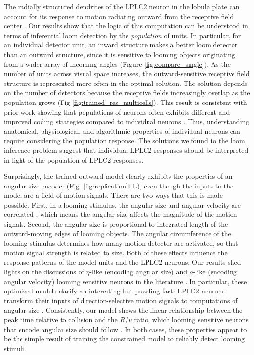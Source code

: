 \documentclass[pdftex,9pt,lineno]{elife}
\begin{document}
The radially structured dendrites of the LPLC2 neuron in the lobula plate can account for its response to motion radiating outward from the receptive field center \citep{klapoetke2017ultra}. Our results show that the logic of this computation can be understood in terms of inferential loom detection by the \textit{population} of units. In particular, for an individual detector unit, an inward structure makes a better loom detector than an outward structure, since it is sensitive to looming objects originating from a wider array of incoming angles (Figure \ref{fig:compare_single}). As the number of units across visual space increases, the outward-sensitive receptive field structure is represented more often in the optimal solution. The solution depends on the number of detectors because the receptive fields increasingly overlap as the population grows (Fig \ref{fig:trained_res_multicells}). This result is consistent with prior work showing that populations of neurons often exhibits different and improved coding strategies compared to individual neurons \citep{pasupathy2002population,georgopoulos1986neuronal,vogels1990population,franke2016structures,zylberberg2016direction,cafaro2020global}. Thus, understanding anatomical, physiological, and algorithmic properties of individual neurons can require considering the population response. The solutions we found to the loom inference problem suggest that individual LPLC2 responses should be interpreted in light of the population of LPLC2 responses.

Surprisingly, the trained outward model clearly exhibits the properties of an angular size encoder (Fig. \ref{fig:replication}I-L), even though the inputs to the model are a field of motion signals. There are two ways that this is made possible. First, in a looming stimulus, the angular size and angular velocity are correlated \citep{gabbiani1999computation}, which means the angular size affects the magnitude of the motion signals. Second, the angular size is proportional to integrated length of the outward-moving edges of looming objects. The angular circumference of the looming stimulus determines how many motion detector are activated, so that motion signal strength is related to size. Both of these effects influence the response patterns of the model units and the LPLC2 neurons. Our results shed lights on the discussions of $\eta$-like (encoding angular size) and $\rho$-like (encoding angular velocity) looming sensitive neurons in the literature \citep{gabbiani1999computation,wu2005tectal,liu2011neuronal,shang2015parvalbumin,temizer2015visual,dunn2016neural,von2017feature,ache2019neural}. In particular, these optimized models clarify an interesting but puzzling fact: LPLC2 neurons transform their inputs of direction-selective motion signals to computations of angular size \citep{ache2019neural}. Consistently, our model shows the linear relationship between the peak time relative to collision and the $R/v$ ratio, which looming sensitive neurons that encode angular size should follow \citep{peek2016comparative}. In both cases, these properties appear to be the simple result of training the constrained model to reliably detect looming stimuli.
\end{document}
